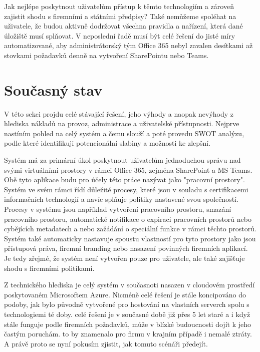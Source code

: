 \documentclass{article}
\begin{document}
\begin{sloppypar}
\begin{spacing}{1.15}
        Jak nejlépe poskytnout uživatelům přístup k těmto technologiím a zároveň 
        zajistit shodu s firemními a státními předpisy? Také nemůžeme spoléhat na 
        uživatele, že budou aktivně dodržovat všechna pravidla a nařízení, která 
        dané úložiště musí splňovat. V neposlední řadě musí být celé řešení do 
        jisté míry automatizované, aby administrátorský tým Office 365 nebyl 
        zavalen desítkami až stovkami požadavků denně na vytvoření SharePointu 
        nebo Teams.
        
        \section*{Současný stav}
        V této sekci projdu celé stávající řešení, jeho výhody a naopak nevýhody
        z hlediska nákladů na provoz, administrace a uživatelské přístupnosti.
        Nejprve nastíním pohled na celý systém a čemu slouží a poté provedu SWOT
        analýzu, podle které identifikuji potencionální slabiny a možnosti ke
        zlepšní.

        Systém má za primární úkol poskytnout uživatelům jednoduchou správu nad
        svými virtuálními prostory v rámci Office 365, zejména SharePoint a MS
        Teams. Obě tyto aplikace budu pro účely této práce nazývat jako
        "pracovní prostory". Systém ve svém rámci řídí důležité procesy, které 
        jsou v souladu s certifikacemi informačních technologií a navíc splňuje 
        politiky nastavené svou společností. Procesy v systému jsou například 
        vytvoření pracovního prostoru, smazání pracovního prostoru, automatické
        notifikace o expiraci pracovních prostorů nebo cybějících metadatech a
        nebo zažádání o speciální funkce v rámci těchto prostorů. Systém také
        automaticky nastavuje spoustu vlastností pro tyto prostory jako jsou
        přístupová práva, firemní branding nebo nasazení povinných firemních
        aplikací. Je tedy zřejmé, že systém není vytvořen pouze pro uživatele,
        ale také zajišťuje shodu s firemními politikami.

        Z technického hlediska je celý systém v současnoti nasazen v cloudovém 
        prostředí poskytovaném Microsoftem Azure. Nicméně celé řešení je stále 
        koncipováno do podoby, jak bylo původně vytvořené pro hostování na 
        vlastních serverch spolu s technologiemi té doby. celé řešení je v 
        současné době již přes 5 let staré a i když stále funguje podle firemních 
        požadavků, může v blízké budoucnosti dojít k jeho častým poruchám. to by
        znamenalo pro firmu v krajním případě i nemalé ztráty. A právě proto se 
        nyní pokusím zjistit, jak tomuto scénáři předejít.


\end{spacing}
\end{sloppypar}
\end{document}

